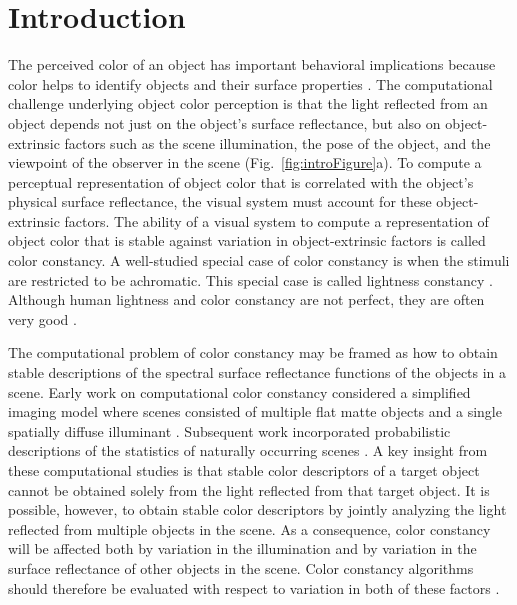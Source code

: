\documentclass{jov}
\begin{document}

\maketitle

\section{Introduction}
The perceived color of an object has important behavioral implications because color helps to identify objects and their surface properties \cite{Mollon89, Jacobs81}.
The computational challenge underlying object color perception is that the light reflected from an object depends not just on the object's surface reflectance, but also 
on object-extrinsic factors such as the scene illumination, the pose of the object, and the viewpoint of the observer in the scene (Fig.~\ref{fig:introFigure}a).
To compute a perceptual representation of object color that is correlated with the object's physical surface reflectance, the visual system must account for these object-extrinsic factors.
The ability of a visual system to compute a representation of object color that is stable against variation in object-extrinsic factors is called color constancy. 
A well-studied special case of color constancy is when the stimuli are restricted to be achromatic. 
This special case is called lightness constancy \cite{gilchrist2006seeing}. 
Although human lightness and color constancy are not perfect, they are often very good \cite{FosterColorConstancy, BrainardColorConstancy,adelson2000,kingdom2011lightness}. 

The computational problem of color constancy may be framed as how to obtain stable descriptions of the spectral surface reflectance functions of the objects in a scene.
Early work on computational color constancy considered a simplified imaging model where scenes consisted of multiple flat matte objects and a single spatially diffuse illuminant \cite{LandRetinex,Buchsbaum80,MaloneyWandell86}.
Subsequent work incorporated probabilistic descriptions of the statistics of naturally occurring scenes \cite{D'ZmuraConstancy3, D'ZmuraIversonSinger,BrainardFreeman}.
A key insight from these computational studies is that stable color descriptors of a target object cannot be obtained solely from the light reflected from that target object.
It is possible, however, to obtain stable color descriptors by jointly analyzing the light reflected from multiple objects in the scene.
As a consequence, color constancy will be affected both by variation in the illumination and by variation in the surface reflectance of other objects in the scene.  Color constancy algorithms should therefore be evaluated with respect to variation in both of these factors \cite{brainard1986analysis,BrainardFreeman}. 
\end{document}
